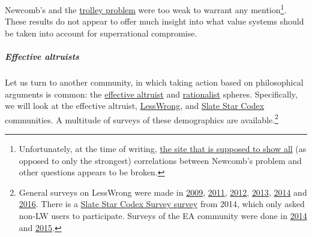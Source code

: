 Newcomb's and the
\href{https://en.wikipedia.org/wiki/Trolley_problem}{trolley
problem} were too weak to warrant any mention\footnote{Unfortunately,
  at the time of writing,
  \href{http://philpapers.org/surveys/linear_most_with.pl?A=main\%3ANewcomb\&flip=on\#main}{the
  site that is supposed to show all} (as opposed to only the strongest)
  correlations between Newcomb's problem and other questions appears to
  be broken.}. These results do not appear to offer much insight into
what value systems should be taken into account for superrational
compromise.

\hypertarget{effective-altruists}{\subparagraph{Effective
altruists}\label{effective-altruists}}

Let us turn to another community, in which taking action based on
philosophical arguments is common: the
\href{https://en.wikipedia.org/wiki/Effective_altruismhttps://en.wikipedia.org/wiki/Effective_altruism}{effective
altruist} and
\href{http://slatestarcodex.com/2014/09/05/mapmaker-mapmaker-make-me-a-map/}{rationalist}
spheres. Specifically, we will look at the effective altruist,
\href{https://en.wikipedia.org/wiki/LessWrong}{LessWrong}, and
\href{http://slatestarcodex.com/}{Slate Star Codex} communities.
A multitude of surveys of these demographics are available.\footnote{General
  surveys on LessWrong were made in
  \href{http://lesswrong.com/lw/fk/survey_results/}{2009},
  \href{http://lesswrong.com/lw/8p4/2011_survey_results/}{2011},
  \href{http://lesswrong.com/lw/fp5/2012_survey_results/}{2012},
  \href{http://lesswrong.com/lw/jj0/2013_survey_results/}{2013},
  \href{http://lesswrong.com/lw/lhg/2014_survey_results/}{2014}
  and
  \href{http://lesswrong.com/lw/nkw/2016_lesswrong_diaspora_survey_results/}{2016}.
  There is a
  \href{http://slatestarcodex.com/2015/11/04/2014-ssc-survey-results/}{Slate
  Star Codex Survey survey} from 2014, which only asked non-LW users to
  participate. Surveys of the EA community were done in
  \href{https://webcache.googleusercontent.com/search?q=cache:nmlsoMrw1JMJ:https://eahub.org/sites/effectivealtruismhub.com/files/survey/2014/results-and-analysis.pdf+\&cd=1\&hl=en\&ct=clnk\&gl=de}{2014}
  and
  \href{https://eahub.org/sites/eahub.org/files/SurveyReport2015.pdf}{2015}.}

